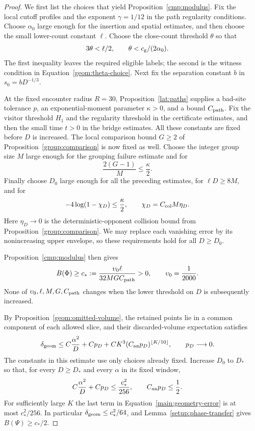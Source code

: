 \begin{proof}
We first list the choices that yield Proposition~\ref{cmp:modulus}.
Fix the local cutoff profiles and the exponent $\gamma=1/12$ in the
path regularity conditions. Choose $\alpha_0$ large enough for the
insertion and spatial estimates, and then choose the small lower-count
constant $\ell$. Choose the close-count threshold $\theta$ so that
\[
 3\theta<\ell/2,\qquad \theta<c_{\rm g}/(2\alpha_0).
\]
The first inequality leaves the required eligible labels; the second
is the witness condition in Equation~\eqref{geom:theta-choice}.
Next fix the separation constant $b$ in $s_0=bD^{-1/3}$.

At the fixed encounter radius $R=30$, Proposition~\ref{lat:paths}
supplies a bad-site tolerance $p$, an exponential-moment parameter
$\kappa>0$, and a bound $C_{\rm path}$. Fix the visitor threshold
$H_1$ and the regularity threshold in the certificate estimates, and
then the small time $t>0$ in the bridge estimates. All these constants
are fixed before $D$ is increased. The local comparison bound
$G\ge2$ of Proposition~\ref{group:comparison} is now fixed as well.
Choose the integer group size $M$ large enough for the grouping
failure estimate and for
\[
 \frac{2(G-1)}M\le\frac\kappa2.
\]
Finally choose $D_0$ large enough for all the preceding estimates, for
$\ell D\ge8M$, and for
\[
 -4\log(1-\chi_D)\le\frac\kappa2,
 \qquad \chi_D=C_{\rm col}M\eta_D.
\]
Here $\eta_D\to0$ is the deterministic-opponent collision bound from
Proposition~\ref{group:comparison}. We may replace each vanishing error by
its nonincreasing upper envelope, so these requirements hold for all
$D\ge D_0$.

Proposition~\ref{cmp:modulus} then gives
\begin{equation}\label{main:cstar}
 B(\Phi)\ge c_*:=\frac{\upsilon_0\ell}{32M G C_{\rm path}}>0,
 \qquad \upsilon_0=\frac1{2000}.
\end{equation}
None of $\upsilon_0,\ell,M,G,C_{\rm path}$ changes when the lower threshold on
$D$ is subsequently increased.

By Proposition~\ref{geom:omitted-volume}, the retained points lie in a
common component of each allowed slice, and their discarded-volume
expectation satisfies
\begin{equation}\label{main:geometry-error}
 \delta_{\rm geom}
 \le C\frac{\alpha^2}{D}+C p_D
       +C K^3(C_{\rm an}p_D)^{\lfloor K/10\rfloor},
 \qquad p_D\longrightarrow0.
\end{equation}
The constants in this estimate use only choices already fixed.
Increase $D_0$ to $D_*$ so that, for every $D\ge D_*$ and every
$\alpha$ in its fixed window,
\[
 C\frac{\alpha^2}{D}+Cp_D\le\frac{c_*^2}{256},
 \qquad C_{\rm an}p_D\le\frac12.
\]
For sufficiently large $K$ the last term in
Equation~\eqref{main:geometry-error} is at most $c_*^2/256$.
In particular $\delta_{\rm geom}\le c_*^2/64$, and
Lemma~\ref{setup:phase-transfer} gives $B(\Psi)\ge c_*/2$.


\end{proof}
